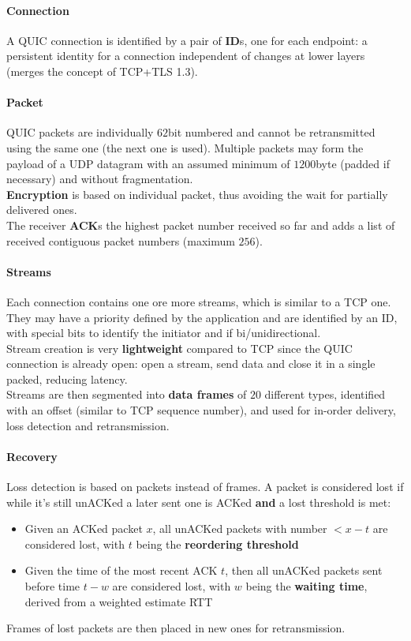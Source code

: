 \paragraph{Connection} A QUIC connection is identified by a pair of \textbf{ID}s, one for each endpoint: a persistent identity for a connection independent of changes at lower layers (merges the concept of TCP+TLS 1.3).
\paragraph{Packet} QUIC packets are individually $62$bit numbered and cannot be retransmitted using the same one (the next one is used). Multiple packets may form the payload of a UDP datagram with an assumed minimum of $1200$byte (padded if necessary) and without fragmentation.\\
\textbf{Encryption} is based on individual packet, thus avoiding the wait for partially delivered ones.\\
The receiver \textbf{ACK}s the highest packet number received so far and adds a list of received contiguous packet numbers (maximum $256$).

\paragraph{Streams} Each connection contains one ore more streams, which is similar to a TCP one. They may have a priority defined by the application and are identified by an ID, with special bits to identify the initiator and if bi/unidirectional.\\
Stream creation is very \textbf{lightweight} compared to TCP since the QUIC connection is already open: open a stream, send data and close it in a single packed, reducing latency.\\
Streams are then segmented into \textbf{data frames} of $20$ different types, identified with an offset (similar to TCP sequence number), and used for in-order delivery, loss detection and retransmission.

\paragraph{Recovery} Loss detection is based on packets instead of frames. A packet is considered lost if while it's still unACKed a later sent one is ACKed \textbf{and} a lost threshold is met:
\begin{itemize}
	\item Given an ACKed packet $x$, all unACKed packets with number $< x-t$ are considered lost, with $t$ being the \textbf{reordering threshold}
	\item Given the time of the most recent ACK $t$, then all unACKed packets sent before time $t-w$ are considered lost, with $w$ being the \textbf{waiting time}, derived from a weighted estimate RTT
\end{itemize}
Frames of lost packets are then placed in new ones for retransmission.

